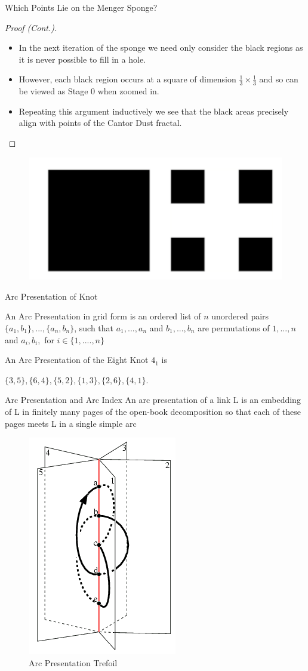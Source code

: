 \begin{frame}{Which Points Lie on the Menger Sponge?}
\begin{proof}[Proof (Cont.)]
\begin{itemize}
    \item In the next iteration of the sponge we need only consider the black regions as it is never possible to fill in a hole. 
    \item However, each black region occurs at a square of dimension $\frac{1}{3}\times\frac{1}{3}$ and so can be viewed as Stage $0$ when zoomed in. 
    \item Repeating this argument inductively we see that the black areas precisely align with points of the Cantor Dust fractal.
\end{itemize}
\end{proof}
\begin{figure}
        \centering
        \includegraphics[width=0.22\linewidth]{ProofOfPointsOnSponge.png}
    \end{figure}
\end{frame}

\begin{frame}{Arc Presentation of Knot}
\begin{definition}
    An Arc Presentation in grid form is an ordered list of $n$ unordered pairs
$\{a_1, b_1\}, ..., \{a_n, b_n\}$,
such that $a_1, ..., a_n$ and $b_1, ..., b_n$ are permutations of $1, ..., n$ and
$a_i , b_i,$ for $ i \in \{1, ...., n\}$
\end{definition}

\begin{example}
    An Arc Presentation of the Eight Knot $4_1$ is
    \begin{center}
        $\{3, 5\}, \{6, 4\}, \{5, 2\}, \{1, 3\}, \{2, 6\}, \{4, 1\}$.
    \end{center}

\end{example}
\end{frame}

\begin{frame}{Arc Presentation and Arc Index}
An arc presentation of a link L is an embedding of L in finitely many pages of the open-book decomposition so that each of these pages meets L in a single simple arc
\begin{figure}
    \centering
    \includegraphics[width=0.2\linewidth]{MichaelImages/arc_index_fig1.png}
    \caption{Arc Presentation Trefoil}
    \label{fig:enter-label}
\end{figure}
\end{frame}

